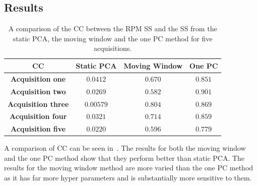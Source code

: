         \subsection{Results} \label{sec:pca_data_driven_surrogate_signal_extraction_methods_for_dynamic_pet_results}
            \begin{table}
                \centering
                
                \captionsetup{singlelinecheck=false, justification=centering}
                \caption{A comparison of the \gls{CC} between the \gls{RPM} \gls{SS} and the \gls{SS} from the static \gls{PCA}, the moving window and the one \gls{PC} method for five acquisitions.}
                
                \resizebox*{1.0\linewidth}{!}
                {
                    \begin{tabular}{||c|ccc||}
                        \hline
                        \textbf{\gls{CC}} & \textbf{Static \gls{PCA}} & \textbf{Moving Window} & \textbf{One \gls{PC}} \\
                        \hline
                        \textbf{Acquisition one}    & $0.0412$  & $0.670$ & $0.851$ \\
                        \textbf{Acquisition two}    & $0.0269$  & $0.582$ & $0.901$ \\
                        \textbf{Acquisition three}  & $0.00579$ & $0.804$ & $0.869$ \\
                        \textbf{Acquisition four}   & $0.0321$  & $0.714$ & $0.859$ \\
                        \textbf{Acquisition five}   & $0.0220$  & $0.596$ & $0.779$ \\
                        \hline
                    \end{tabular}
                }
                \label{tab:pca_data_driven_surrogate_signal_extraction_methods_for_dynamic_pet_results_cross_correlation}
            \end{table}
            
            A comparison of \gls{CC} can be seen in~. The results for both the moving window and the one \gls{PC} method show that they perform better than static \gls{PCA}. The results for the moving window method are more varied than the one \gls{PC} method as it has far more hyper parameters and is substantially more sensitive to them.
            
